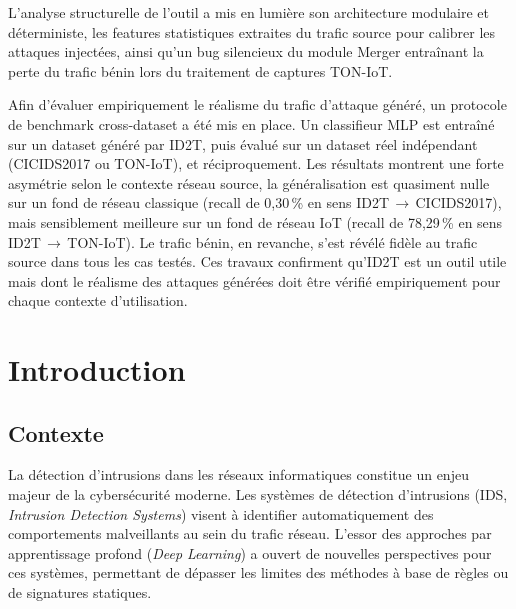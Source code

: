 \documentclass[12pt, a4paper]{report}
\begin{document}
L'analyse structurelle de l'outil a mis en lumière son architecture modulaire et
déterministe, les features statistiques extraites du trafic source pour calibrer les
attaques injectées, ainsi qu'un bug silencieux du module Merger entraînant la perte du
trafic bénin lors du traitement de captures TON-IoT.
 
Afin d'évaluer empiriquement le réalisme du trafic d'attaque généré, un protocole de
benchmark cross-dataset a été mis en place. Un classifieur MLP est entraîné sur un
dataset généré par ID2T, puis évalué sur un dataset réel indépendant (CICIDS2017 ou
TON-IoT), et réciproquement. Les résultats montrent une forte asymétrie selon le
contexte réseau source, la généralisation est quasiment nulle sur un fond de réseau
classique (recall de 0,30\,\% en sens ID2T\,$\rightarrow$\,CICIDS2017), mais
sensiblement meilleure sur un fond de réseau IoT (recall de 78,29\,\% en sens
ID2T\,$\rightarrow$\,TON-IoT). Le trafic bénin, en revanche, s'est révélé fidèle au
trafic source dans tous les cas testés. Ces travaux confirment qu'ID2T est un outil
utile mais dont le réalisme des attaques générées doit être vérifié empiriquement
pour chaque contexte d'utilisation.

\newpage

\tableofcontents
\newpage
 
\listoffigures
\listoftables
\newpage
 
 
 
\chapter{Introduction}
 
\section{Contexte}
 
La détection d'intrusions dans les réseaux informatiques constitue un enjeu majeur de la cybersécurité moderne.
Les systèmes de détection d'intrusions (IDS, \textit{Intrusion Detection Systems}) visent à identifier
automatiquement des comportements malveillants au sein du trafic réseau.
L'essor des approches par apprentissage profond (\textit{Deep Learning}) a ouvert de nouvelles perspectives pour
ces systèmes, permettant de dépasser les limites des méthodes à base de règles ou de signatures statiques.
 
\end{document}
